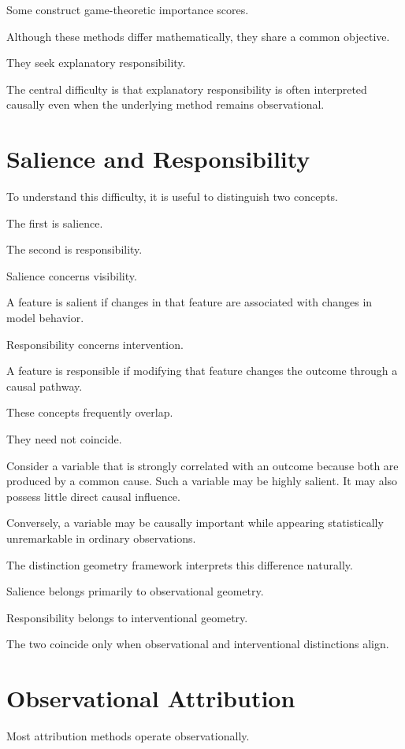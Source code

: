 \documentclass[11pt,oneside,openany]{book}
\begin{document}
Some construct game-theoretic importance scores.

Although these methods differ mathematically, they share a common objective.

They seek explanatory responsibility.

The central difficulty is that explanatory responsibility is often interpreted causally even when the underlying method remains observational.

\section{Salience and Responsibility}

To understand this difficulty, it is useful to distinguish two concepts.

The first is salience.

The second is responsibility.

Salience concerns visibility.

A feature is salient if changes in that feature are associated with changes in model behavior.

Responsibility concerns intervention.

A feature is responsible if modifying that feature changes the outcome through a causal pathway.

These concepts frequently overlap.

They need not coincide.

Consider a variable that is strongly correlated with an outcome because both are produced by a common cause. Such a variable may be highly salient. It may also possess little direct causal influence.

Conversely, a variable may be causally important while appearing statistically unremarkable in ordinary observations.

The distinction geometry framework interprets this difference naturally.

Salience belongs primarily to observational geometry.

Responsibility belongs to interventional geometry.

The two coincide only when observational and interventional distinctions align.

\section{Observational Attribution}

Most attribution methods operate observationally.
\end{document}
